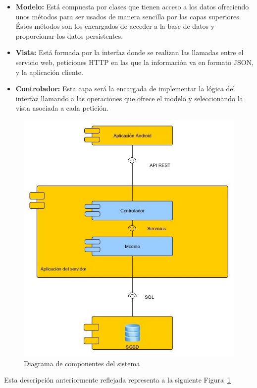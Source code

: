 \begin{itemize}
\item \textbf{Modelo:}
Está compuesta por clases que tienen acceso a los datos ofreciendo unos métodos para ser usados de manera sencilla por las capas superiores. Éstos métodos son los encargados de acceder a la base de datos y proporcionar los datos persistentes.
\item \textbf{Vista:}
Está formada por la interfaz donde se realizan las llamadas entre el servicio web, peticiones HTTP en las que la información va en formato JSON, y la aplicación cliente.
\item \textbf{Controlador:}
Esta capa será la encargada de implementar la lógica del interfaz llamando a las operaciones que ofrece el modelo y seleccionando la vista asociada a cada petición.
\end{itemize}
\begin{figure}
		\centering
		\includegraphics[width=\textwidth] {componentes.jpg}
		\caption{Diagrama de componentes del sistema }\label{fig:componentes}
	\end{figure}
 Esta descripción anteriormente reflejada representa a la siguiente Figura~\ref{fig:componentes}
